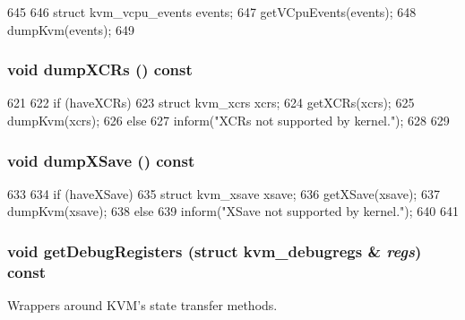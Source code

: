 \begin{DoxyCode}
645 {
646     struct kvm_vcpu_events events;
647     getVCpuEvents(events);
648     dumpKvm(events);
649 }
\end{DoxyCode}
\hypertarget{classX86KvmCPU_a80e6ff34faeb5d05343e77809a203ec8}{
\subsubsection[{dumpXCRs}]{\setlength{\rightskip}{0pt plus 5cm}void dumpXCRs () const}}
\label{classX86KvmCPU_a80e6ff34faeb5d05343e77809a203ec8}



\begin{DoxyCode}
621 {
622     if (haveXCRs) {
623         struct kvm_xcrs xcrs;
624         getXCRs(xcrs);
625         dumpKvm(xcrs);
626     } else {
627         inform("XCRs not supported by kernel.\n");
628     }
629 }
\end{DoxyCode}
\hypertarget{classX86KvmCPU_a84c89612fa5d62bf131915036e99c8ee}{
\subsubsection[{dumpXSave}]{\setlength{\rightskip}{0pt plus 5cm}void dumpXSave () const}}
\label{classX86KvmCPU_a84c89612fa5d62bf131915036e99c8ee}



\begin{DoxyCode}
633 {
634     if (haveXSave) {
635         struct kvm_xsave xsave;
636         getXSave(xsave);
637         dumpKvm(xsave);
638     } else {
639         inform("XSave not supported by kernel.\n");
640     }
641 }
\end{DoxyCode}
\hypertarget{classX86KvmCPU_a62688c8626ebb350e3748a2cd1fa44a8}{
\subsubsection[{getDebugRegisters}]{\setlength{\rightskip}{0pt plus 5cm}void getDebugRegisters (struct kvm\_\-debugregs \& {\em regs}) const}}
\label{classX86KvmCPU_a62688c8626ebb350e3748a2cd1fa44a8}
Wrappers around KVM's state transfer methods. 


